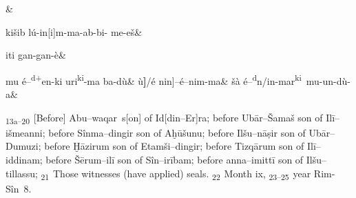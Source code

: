 \documentclass{memoir}
\newcommand{\blankline}{\begin{stanza}
	\skipnumbering\quad{\footnotesize‹space›}\&
	\end{stanza}
}
\newcommand{\blankright}{\noindent\skipnumbering{}\pend}
\newcommand{\smn}[1]{#1}
\newcommand{\nml}[1]{{\sffamily #1}}
\newcommand{\D}{\textsuperscript{d}}
\newcommand{\dtm}[1]{\textsuperscript{#1}}
\newcommand{\tl}{/}
\newcommand{\rbb}{\textbf{]}}
\newcommand{\Awu}{Abu--waqar}
\newcommand{\RS}{Rim-Sîn}
\begin{document}
\begin{pairs}
\begin{Leftside}
\begin{astanza}
\end{astanza}
\blankline
\begin{astanza}
\smn{kišib lú-in[i]m-ma-ab-bi- me-eš}\&
\end{astanza}
\begin{astanza}
\smn{iti gan-gan-è}\&
\end{astanza}
\begin{astanza}
\smn{mu é--}\dtm{d+}\smn{en-ki}\smn{ uri}\dtm{ki}\smn{-ma ba-dù}&
\smn{ù\rbb  \tl é nin]--é--nim-ma}&
\smn{šà é--}\D\smn{n\tl in-mar}\dtm{ki}\smn{\ mu-un-dù-a}\&
\end{astanza}
\endnumbering
\end{Leftside}
\begin{Rightside}
\beginnumbering
\autopar
\noindent\textsubscript{13a--20~}[Before] \Awu\ s[on] of \nml{Id[din–Er]ra};\pend
\noindent before \nml{Ubār--Šamaš} son of \nml{Ilī--išmeanni};\pend
\noindent before \nml{Sînma--dingir} son of \nml{Aḫūšunu};\pend
\noindent before \nml{Ilšu--nāṣir} son of \nml{Ubār--Dumuzi};\pend
\noindent before \nml{Ḫāzirum} son of \nml{Etamši--}dingir;\pend
\noindent before \nml{Tizqārum} son of \nml{Ilī--iddinam};\pend
\noindent before \nml{Šērum--ilī} son of \nml{Sîn--irībam};\pend
\noindent before anna\nml{--imittī} son of \nml{Ilšu--tillassu};\pend
\blankright
\noindent\textsubscript{21~}Those witnesses (have applied) seals.\pend
\noindent\textsubscript{22~}Month ix,\pend
\noindent\textsubscript{23--25~}year \RS~8.\pend
\endnumbering
\end{Rightside}
\end{pairs}
\Columns
{}\leavevmode
\end{document}

